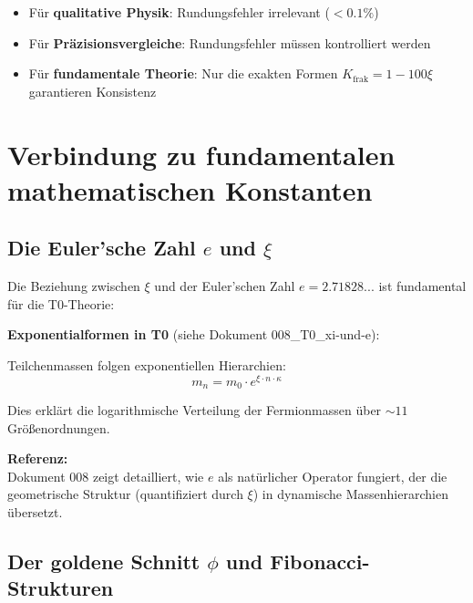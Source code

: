 	\begin{itemize}
		\item Für \textbf{qualitative Physik}: Rundungsfehler irrelevant ($< 0.1\%$)
		\item Für \textbf{Präzisionsvergleiche}: Rundungsfehler müssen kontrolliert werden
		\item Für \textbf{fundamentale Theorie}: Nur die exakten Formen $K_{\text{frak}} = 1 - 100\xi$ garantieren Konsistenz
	\end{itemize}
	
	\section{Verbindung zu fundamentalen mathematischen Konstanten}
	
	\subsection{Die Euler'sche Zahl $e$ und $\xi$}
	
	Die Beziehung zwischen $\xi$ und der Euler'schen Zahl $e = 2.71828...$ ist fundamental für die T0-Theorie:
	
	\begin{beziehung}
		\textbf{Exponentialformen in T0} (siehe Dokument 008\_T0\_xi-und-e):
		
		Teilchenmassen folgen exponentiellen Hierarchien:
		\begin{equation}
			m_n = m_0 \cdot e^{\xi \cdot n \cdot \kappa}
		\end{equation}
		
		Dies erklärt die logarithmische Verteilung der Fermionmassen über $\sim 11$ Größenordnungen.
		
		\textbf{Referenz:} \\

		Dokument 008 zeigt detailliert, wie $e$ als natürlicher Operator fungiert, der die geometrische Struktur (quantifiziert durch $\xi$) in dynamische Massenhierarchien übersetzt.
	\end{beziehung}
	
	\subsection{Der goldene Schnitt $\phi$ und Fibonacci-Strukturen}
	
